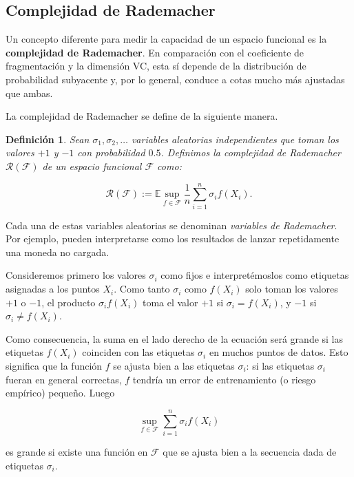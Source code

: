 \documentclass{article}
\newtheorem{dfn}{Definición}[subsection]
\begin{document}
\subsection{Complejidad de Rademacher}
Un concepto diferente para medir la capacidad de un espacio funcional es la \textbf{complejidad de Rademacher}. 
En comparación con el coeficiente de fragmentación y la dimensión VC, esta sí depende de la distribución de 
probabilidad subyacente y, por lo general, conduce a cotas mucho más ajustadas que ambas.\newline

La complejidad de Rademacher se define de la siguiente manera.\newline

\begin{dfn}
Sean \(\sigma_1, \sigma_2, \dots\) variables aleatorias independientes que toman los valores \(+1\) y \(-1\) 
con probabilidad \(0.5\). Definimos la complejidad de Rademacher \(\mathscr{R}(\mathcal{F})\) de un espacio funcional 
\(\mathcal{F}\) como:

\[
    \mathscr{R}(\mathcal{F}) := \mathbb{E} \sup_{f \in \mathcal{F}} \frac{1}{n} \sum_{i=1}^{n} \sigma_i f(X_i).
\]
\end{dfn}

Cada una de estas variables aleatorias se denominan \textit{variables de Rademacher}. 
Por ejemplo, pueden interpretarse como los resultados de lanzar repetidamente una moneda no cargada. 

Consideremos primero los valores \(\sigma_i\) como fijos e interpretémoslos como etiquetas asignadas a los puntos \(X_i\). Como tanto 
\(\sigma_i\) como \(f(X_i)\) solo toman los valores \(+1\) o \(-1\), el producto \(\sigma_i f(X_i)\) toma el 
valor \(+1\) si \(\sigma_i = f(X_i)\), y \(-1\) si \(\sigma_i \neq f(X_i)\). \newline

Como consecuencia, la suma en el lado derecho de la ecuación será grande si las etiquetas \(f(X_i)\) 
coinciden con las etiquetas \(\sigma_i\) en muchos puntos de datos. Esto significa que la función \(f\) 
se ajusta bien a las etiquetas \(\sigma_i\): si las etiquetas \(\sigma_i\) fueran en general correctas, 
\(f\) tendría un error de entrenamiento (o riesgo empírico) pequeño. Luego

\[
\sup_{f \in \mathcal{F}} \sum_{i=1}^{n} \sigma_i f(X_i)
\]

es grande si existe una función en \(\mathcal{F}\) que se ajusta bien a la secuencia dada de etiquetas \(\sigma_i\). \newline
\end{document}
